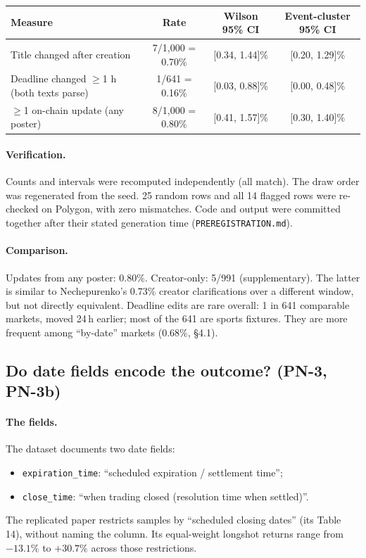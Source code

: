 \documentclass[10pt]{article}
\newcommand{\code}[1]{\texttt{#1}}
\begin{document}
\begin{table}[h]\centering\small
\begin{tabular}{lccc}\toprule
Measure & Rate & Wilson 95\% CI & Event-cluster 95\% CI\\\midrule
Title changed after creation & 7/1,000 = 0.70\% & [0.34, 1.44]\% & [0.20, 1.29]\%\\
Deadline changed $\geq$1 h (both texts parse) & 1/641 = 0.16\% & [0.03, 0.88]\% & [0.00, 0.48]\%\\
$\geq$1 on-chain update (any poster) & 8/1,000 = 0.80\% & [0.41, 1.57]\% & [0.30, 1.40]\%\\\bottomrule
\end{tabular}
\end{table}

\paragraph{Verification.} Counts and intervals were recomputed independently
(all match). The draw order was regenerated from the seed. 25 random rows and
all 14 flagged rows were re-checked on Polygon, with zero mismatches. Code and
output were committed together after their stated generation time
(\texttt{PREREGISTRATION.md}).

\paragraph{Comparison.} Updates from any poster: 0.80\%. Creator-only: 5/991
(supplementary). The latter is similar to Nechepurenko's 0.73\% creator
clarifications over a different window, but not directly equivalent. Deadline
edits are rare overall: 1 in 641 comparable markets, moved 24\,h earlier; most
of the 641 are sports fixtures. They are more frequent among ``by-date''
markets (0.68\%, \S4.1).

\subsection{Do date fields encode the outcome? (PN-3, PN-3b)}

\paragraph{The fields.} The dataset documents two date fields:
\begin{itemize}[nosep]
  \item \code{expiration\_time}: ``scheduled expiration / settlement time'';
  \item \code{close\_time}: ``when trading closed (resolution time when
        settled)''.
\end{itemize}
The replicated paper restricts samples by ``scheduled closing dates'' (its
Table 14), without naming the column. Its equal-weight longshot returns range
from $-13.1\%$ to $+30.7\%$ across those restrictions.
\end{document}
